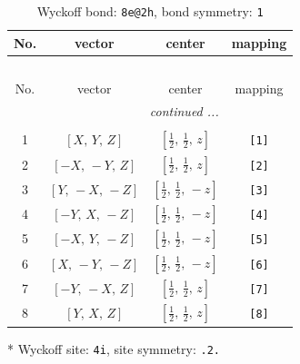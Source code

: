 \documentclass[fleqn,8pt]{jsarticle}
\begin{document}
\begin{longtable}{cccc}
\caption{Wyckoff bond: {\tt 8e@2h}, bond symmetry: {\tt 1}}
 \\
 \hline \hline
No. & vector & center & mapping \\ \hline \endfirsthead

\multicolumn{3}{l}{\tablename\ \thetable{}} \\
 \hline \hline
No. & vector & center & mapping \\ \hline \endhead

 \hline \hline
\multicolumn{3}{r}{\footnotesize\it continued ...} \\ \endfoot

 \hline \hline
\multicolumn{3}{r}{} \\ \endlastfoot

1 & $\left[ X,\, Y,\, Z \right]$ & $\left[ \frac{1}{2},\, \frac{1}{2},\, z \right]$ & {\tt [1]} \\ \hline
2 & $\left[ - X,\, - Y,\, Z \right]$ & $\left[ \frac{1}{2},\, \frac{1}{2},\, z \right]$ & {\tt [2]} \\ \hline
3 & $\left[ Y,\, - X,\, - Z \right]$ & $\left[ \frac{1}{2},\, \frac{1}{2},\, - z \right]$ & {\tt [3]} \\ \hline
4 & $\left[ - Y,\, X,\, - Z \right]$ & $\left[ \frac{1}{2},\, \frac{1}{2},\, - z \right]$ & {\tt [4]} \\ \hline
5 & $\left[ - X,\, Y,\, - Z \right]$ & $\left[ \frac{1}{2},\, \frac{1}{2},\, - z \right]$ & {\tt [5]} \\ \hline
6 & $\left[ X,\, - Y,\, - Z \right]$ & $\left[ \frac{1}{2},\, \frac{1}{2},\, - z \right]$ & {\tt [6]} \\ \hline
7 & $\left[ - Y,\, - X,\, Z \right]$ & $\left[ \frac{1}{2},\, \frac{1}{2},\, z \right]$ & {\tt [7]} \\ \hline
8 & $\left[ Y,\, X,\, Z \right]$ & $\left[ \frac{1}{2},\, \frac{1}{2},\, z \right]$ & {\tt [8]} \\
\end{longtable}
* Wyckoff site: {\tt 4i}, site symmetry: {\tt .2.}
\renewcommand{\arraystretch}{1.2}
\end{document}
